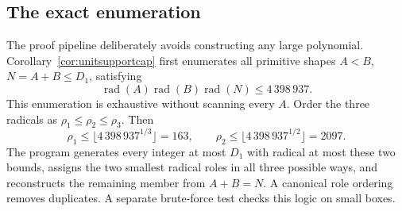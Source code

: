 \documentclass[11pt]{article}
\theoremstyle{definition}
\begin{document}
\subsection{The exact enumeration}

The proof pipeline deliberately avoids constructing any large polynomial.
Corollary~\ref{cor:unitsupportcap} first enumerates all primitive shapes
\(A<B\), \(N=A+B\leq D_1\), satisfying
\[
 \operatorname{rad}(A)\operatorname{rad}(B)\operatorname{rad}(N)
 \leq4\,398\,937.
\]
This enumeration is exhaustive without scanning every \(A\).  Order the
three radicals as \(\rho_1\leq\rho_2\leq\rho_3\).  Then
\[
 \rho_1\leq\lfloor4\,398\,937^{1/3}\rfloor=163,
 \qquad
 \rho_2\leq\lfloor4\,398\,937^{1/2}\rfloor=2097.
\]
The program generates every integer at most \(D_1\) with radical at most
these two bounds, assigns the two smallest radical roles in all three possible
ways, and reconstructs the remaining member from \(A+B=N\).  A canonical
role ordering removes duplicates.  A separate brute-force test checks this
logic on small boxes.
\end{document}
